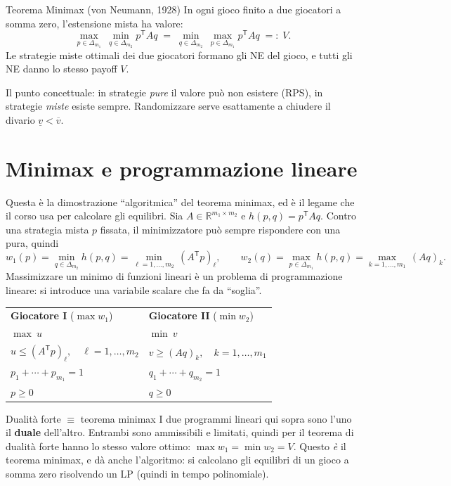 \documentclass[12pt,a4paper,twoside]{book}
\theoremstyle{plain}
\theoremstyle{definition}
\begin{document}
\begin{thmbox}{Teorema Minimax (von Neumann, 1928)}
In ogni gioco finito a due giocatori a somma zero, l'estensione mista ha valore:
\[
  \max_{p\in\Delta_{m_1}}\ \min_{q\in\Delta_{m_2}} p^{\mathsf T}\!Aq
  \;=\;
  \min_{q\in\Delta_{m_2}}\ \max_{p\in\Delta_{m_1}} p^{\mathsf T}\!Aq
  \;=:\;V .
\]
Le strategie miste ottimali dei due giocatori formano gli NE del gioco, e tutti
gli NE danno lo stesso payoff $V$.
\end{thmbox}

Il punto concettuale: in strategie \emph{pure} il valore può non esistere (RPS),
in strategie \emph{miste} esiste sempre. Randomizzare serve esattamente a chiudere
il divario $\underline{v}<\overline{v}$.

\section{Minimax e programmazione lineare}

Questa è la dimostrazione ``algoritmica'' del teorema minimax, ed è il legame che
il corso usa per calcolare gli equilibri. Sia $A\in\mathbb{R}^{m_1\times m_2}$ e
$h(p,q)=p^{\mathsf T}\!Aq$. Contro una strategia mista $p$ fissata, il minimizzatore
può sempre rispondere con una pura, quindi
\[
  w_1(p)=\min_{q\in\Delta_{m_2}} h(p,q)=\min_{\ell=1,\dots,m_2}\,(A^{\mathsf T}p)_\ell,
  \qquad
  w_2(q)=\max_{p\in\Delta_{m_1}} h(p,q)=\max_{k=1,\dots,m_1}\,(Aq)_k .
\]
Massimizzare un minimo di funzioni lineari è un problema di programmazione lineare:
si introduce una variabile scalare che fa da ``soglia''.

\begin{center}
\begin{tabular}{p{} p{}}
\textbf{Giocatore I} ($\max w_1$) & \textbf{Giocatore II} ($\min w_2$)\\[2pt]
$\max\ u$ & $\min\ v$ \\
\quad $u\le (A^{\mathsf T}p)_\ell,\quad \ell=1,\dots,m_2$ &
\quad $v\ge (Aq)_k,\quad k=1,\dots,m_1$ \\
\quad $p_1+\cdots+p_{m_1}=1$ & \quad $q_1+\cdots+q_{m_2}=1$ \\
\quad $p\ge 0$ & \quad $q\ge 0$
\end{tabular}
\end{center}

\begin{thmbox}{Dualità forte $\equiv$ teorema minimax}
I due programmi lineari qui sopra sono l'uno il \textbf{duale} dell'altro. Entrambi
sono ammissibili e limitati, quindi per il teorema di dualità forte hanno lo stesso
valore ottimo: $\max w_1=\min w_2=V$. Questo \emph{è} il teorema minimax, e dà anche
l'algoritmo: si calcolano gli equilibri di un gioco a somma zero risolvendo un LP
(quindi in tempo polinomiale).
\end{thmbox}
\end{document}
